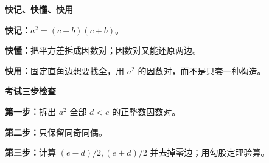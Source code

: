 \clearpage
\begin{summarybox}
\textbf{\textcolor{CSummary}{快记、快懂、快用}}
\par\medskip
\begin{center}

\end{center}
\medskip
\textbf{快记：}$a^2=(c-b)(c+b)$。\par\textbf{快懂：}把平方差拆成因数对；因数对又能还原两边。\par\textbf{快用：}固定直角边想要找全，用 $a^2$ 的因数对，而不是只套一种构造。
\end{summarybox}
\clearpage
\begin{summarybox}
\textbf{\textcolor{CSummary}{考试三步检查}}
\par\medskip
\begin{center}

\end{center}
\medskip
\textbf{第一步：}拆出 $a^2$ 全部 $d<e$ 的正整数因数对。\par\textbf{第二步：}只保留同奇同偶。\par\textbf{第三步：}计算 $(e-d)/2,(e+d)/2$ 并去掉零边；用勾股定理验算。
\end{summarybox}
